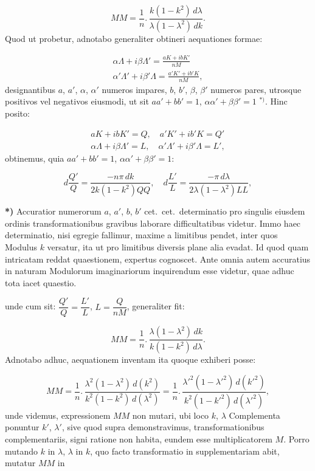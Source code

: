 \documentclass{article}
\begin{document}
\[
MM=\frac{1}{n}.\,\frac{k(1-k^{2})\,d\lambda}{\lambda(1-\lambda^{2})\,dk}.
\]
Quod ut probetur, adnotabo generaliter obtineri aequationes formae:

\[
\begin{gathered}
\alpha\Lambda+i\beta\Lambda'=\frac{aK+ibK'}{nM}\\[1.5ex]
\alpha'\Lambda'+i\beta'\Lambda=\frac{a'K'+ib'K}{nM},
\end{gathered}
\]
designantibus $a$, $a'$, $\alpha$, $\alpha'$ numeros impares, $b$, $b'$, $\beta$, $\beta'$ numeros pares, utrosque positivos vel negativos eiusmodi, ut sit $aa'+bb'=1$, $\alpha\alpha'+\beta\beta'=1$ ${}^{*)}$. Hinc posito:

\[
\begin{gathered}
aK+ibK'=Q,\quad a'K'+ib'K=Q'\\[1ex]
\alpha\Lambda+i\beta\Lambda'=L,\quad\alpha'\Lambda'+i\beta'\Lambda=L',
\end{gathered}
\]
obtinemus, quia $aa'+bb'=1$, $\alpha\alpha'+\beta\beta'=1$:

\[
d\frac{Q'}{Q}=\frac{-n\pi\,dk}{2k(1-k^{2})QQ},\quad d\frac{L'}{L}=\frac{-\pi\,d\lambda}{2\lambda(1-\lambda^{2})LL},
\]

\textbf{*)} Accuratior numerorum $a$, $a'$, $b$, $b'$ cet.\ cet.\ determinatio pro singulis eiusdem ordinis transformationibus gravibus laborare difficultatibus videtur. Immo haec determinatio, nisi egregie fallimur, maxime a limitibus pendet, inter quos Modulus $k$ versatur, ita ut pro limitibus diversis plane alia evadat. Id quod quam intricatam reddat quaestionem, expertus cognoscet. Ante omnia autem accuratius in naturam Modulorum imaginariorum inquirendum esse videtur, quae adhuc tota iacet quaestio.

unde cum sit: $\dfrac{Q'}{Q}=\dfrac{L'}{L}$, $L=\dfrac{Q}{nM}$, generaliter fit:

\[
MM=\frac{1}{n}.\,\frac{\lambda(1-\lambda^{2})\,dk}{k(1-k^{2})\,d\lambda}.
\]
Adnotabo adhuc, aequationem inventam ita quoque exhiberi posse:

\[
MM=\frac{1}{n}.\,\frac{\lambda^{2}(1-\lambda^{2})\,d(k^{2})}{k^{2}(1-k^{2})\,d(\lambda^{2})}=\frac{1}{n}.\,\frac{\lambda'^{2}(1-\lambda'^{2})\,d(k'^{2})}{k^{2}(1-k'^{2})\,d(\lambda'^{2})},
\]
unde videmus, expressionem $MM$ non mutari, ubi loco $k$, $\lambda$ Complementa ponuntur $k'$, $\lambda'$, sive quod supra demonstravimus, transformationibus complementariis, signi ratione non habita, eundem esse multiplicatorem $M$. Porro mutando $k$ in $\lambda$, $\lambda$ in $k$, quo facto transformatio in supplementariam abit, mutatur $MM$ in
\end{document}
